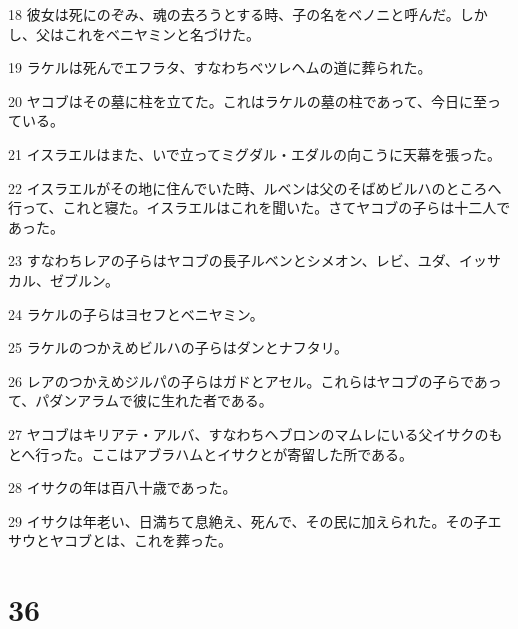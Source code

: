 \par 18 彼女は死にのぞみ、魂の去ろうとする時、子の名をベノニと呼んだ。しかし、父はこれをベニヤミンと名づけた。
\par 19 ラケルは死んでエフラタ、すなわちベツレヘムの道に葬られた。
\par 20 ヤコブはその墓に柱を立てた。これはラケルの墓の柱であって、今日に至っている。
\par 21 イスラエルはまた、いで立ってミグダル・エダルの向こうに天幕を張った。
\par 22 イスラエルがその地に住んでいた時、ルベンは父のそばめビルハのところへ行って、これと寝た。イスラエルはこれを聞いた。さてヤコブの子らは十二人であった。
\par 23 すなわちレアの子らはヤコブの長子ルベンとシメオン、レビ、ユダ、イッサカル、ゼブルン。
\par 24 ラケルの子らはヨセフとベニヤミン。
\par 25 ラケルのつかえめビルハの子らはダンとナフタリ。
\par 26 レアのつかえめジルパの子らはガドとアセル。これらはヤコブの子らであって、パダンアラムで彼に生れた者である。
\par 27 ヤコブはキリアテ・アルバ、すなわちヘブロンのマムレにいる父イサクのもとへ行った。ここはアブラハムとイサクとが寄留した所である。
\par 28 イサクの年は百八十歳であった。
\par 29 イサクは年老い、日満ちて息絶え、死んで、その民に加えられた。その子エサウとヤコブとは、これを葬った。

\chapter{36}

